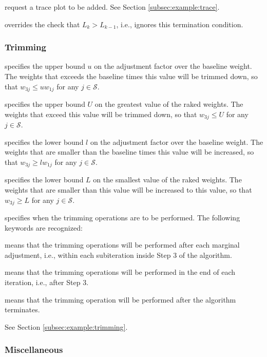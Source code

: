 \hangpara
{} request a trace plot to be added. See
Section \ref{subsec:example:trace}.

\hangpara
{} overrides the check
that $L_k > L_{k-1}$, i.e., ignores this termination condition.

\subsubsection{Trimming}

\hangpara
{} specifies the upper bound $u$ on the adjustment
    factor over the baseline weight. The weights
    that exceeds the baseline times this value will be trimmed down,
    so that $w_{3j} \le u w_{1j}$ for any $j\in\mathcal{S}$.

\hangpara
{} specifies the upper bound $U$ on the greatest
    value of the raked weights.  The weights that
    exceed this value will be trimmed down, so that
    $w_{3j} \le U$ for any $j\in\mathcal{S}$.

\hangpara
{} specifies the lower bound $l$ on the adjustment factor
    over the baseline weight.  The weights that are smaller than the baseline
    times this value will be increased, so that
    $w_{3j} \ge l w_{1j}$ for any $j\in\mathcal{S}$.

\hangpara
{} specifies the lower bound $L$ on the smallest value
    of the raked weights.  The weights that are smaller than this value will
    be increased to this value, so that
    $w_{3j} \ge L$ for any $j\in\mathcal{S}$.

\hangpara
{} specifies when the trimming operations
    are to be performed. The following keywords are recognized:

\morehang {} means that the trimming operations will be performed
    after each marginal adjustment, i.e., within each subiteration inside
    Step 3 of the algorithm.

\morehang {} means that the trimming operations will be performed
    in the end of each iteration, i.e., after Step 3.

\morehang {}
means that the trimming operation will be performed after the algorithm terminates.

See Section \ref{subsec:example:trimming}.

\subsubsection{Miscellaneous}


